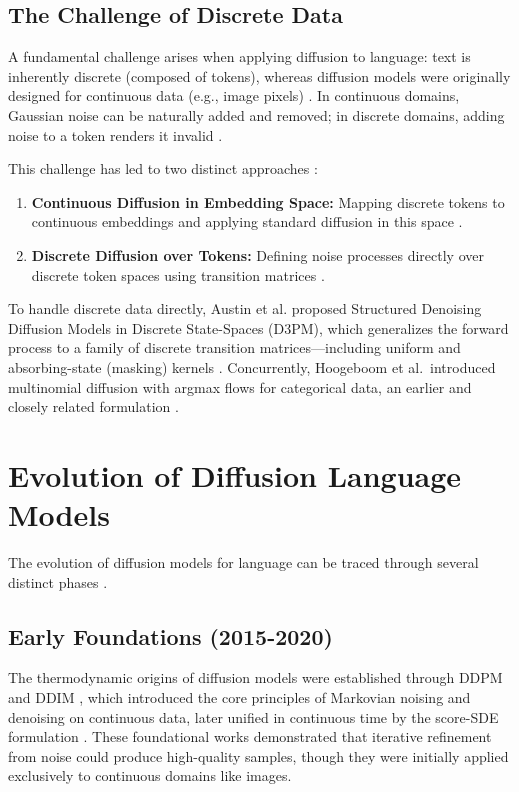 \documentclass[11pt]{article}
\begin{document}
\subsection{The Challenge of Discrete Data}

A fundamental challenge arises when applying diffusion to language: text is inherently discrete (composed of tokens), whereas diffusion models were originally designed for continuous data (e.g., image pixels) \cite{shen2026codar}. In continuous domains, Gaussian noise can be naturally added and removed; in discrete domains, adding noise to a token renders it invalid \cite{jin2025discreteness}.

This challenge has led to two distinct approaches \cite{jin2025discreteness}:

\begin{enumerate}
    \item \textbf{Continuous Diffusion in Embedding Space:} Mapping discrete tokens to continuous embeddings and applying standard diffusion in this space \cite{shen2026codar}.
    \item \textbf{Discrete Diffusion over Tokens:} Defining noise processes directly over discrete token spaces using transition matrices \cite{tseng2025diffusion}.
\end{enumerate}

To handle discrete data directly, Austin et al. proposed Structured Denoising Diffusion Models in Discrete State-Spaces (D3PM), which generalizes the forward process to a family of discrete transition matrices---including uniform and absorbing-state (masking) kernels \cite{austin2021d3pm}. Concurrently, Hoogeboom et al.\ introduced multinomial diffusion with argmax flows for categorical data, an earlier and closely related formulation \cite{hoogeboom2021multinomial}.

\section{Evolution of Diffusion Language Models}

The evolution of diffusion models for language can be traced through several distinct phases \cite{tseng2025diffusion}.

\subsection{Early Foundations (2015-2020)}

The thermodynamic origins of diffusion models were established through DDPM \cite{ho2020denoising} and DDIM \cite{song2021ddim}, which introduced the core principles of Markovian noising and denoising on continuous data, later unified in continuous time by the score-SDE formulation \cite{song2021scoresde}. These foundational works demonstrated that iterative refinement from noise could produce high-quality samples, though they were initially applied exclusively to continuous domains like images.
\end{document}
